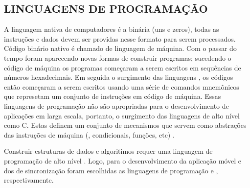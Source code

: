 \subsection{LINGUAGENS DE PROGRAMAÇÃO}

A linguagem nativa de computadores é a binária (uns e zeros), todas as instruções e dados devem ser providas nesse formato para serem processados. Código binário nativo é chamado de linguagem de máquina. Com o passar do tempo foram aparecendo novas formas de construir programas; sucedendo o código de máquina os programas começaram a serem escritos em sequências de números hexadecimais. Em seguida o surgimento das linguagens , os códigos então começaram a serem escritos usando uma série de comandos mnemônicos que represetam um conjunto de instruções em código de máquina. Essas linguagens de programação não são apropriadas para o desenvolvimento de aplicações em larga escala, portanto, o surgimento das linguagens de alto nível como C. Estas definem um conjunto de mecanismos que servem como abstrações das instruções de máquina (, condicionais, funções, etc) \cite{Bailey2005IntroductionC}.

  Construir estruturas de dados e algoritimos requer uma linguagem de programação de alto nível \cite{GoodrichTamassiaMount2011DataStructuresCpp}. Logo, para o desenvolvimento da aplicação móvel e dos  de sincronização foram escolhidas as linguagens de programação  e , respectivamente.  
